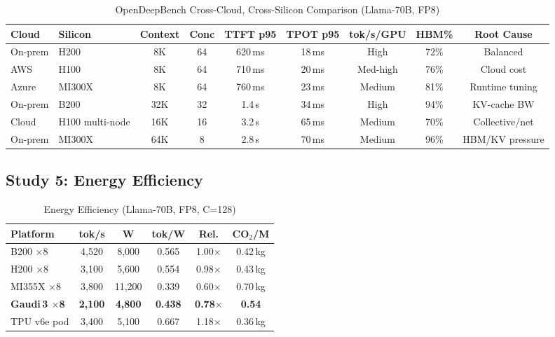 \documentclass[conference,10pt]{IEEEtran}
\begin{document}
\begin{table}[!htbp]
\caption{OpenDeepBench Cross-Cloud, Cross-Silicon Comparison (Llama-70B, FP8)}
\label{tab:odbresults}
\centering\footnotesize
\begin{tabular}{@{}llccccccc@{}}
\toprule
\textbf{Cloud} & \textbf{Silicon} & \textbf{Context} & \textbf{Conc} & \textbf{TTFT p95} & \textbf{TPOT p95} & \textbf{tok/s/GPU} & \textbf{HBM\%} & \textbf{Root Cause} \\
\midrule
On-prem & H200 & 8K & 64 & 620\,ms & 18\,ms & High & 72\% & Balanced \\
AWS & H100 & 8K & 64 & 710\,ms & 20\,ms & Med-high & 76\% & Cloud cost \\
Azure & MI300X & 8K & 64 & 760\,ms & 23\,ms & Medium & 81\% & Runtime tuning \\
On-prem & B200 & 32K & 32 & 1.4\,s & 34\,ms & High & 94\% & KV-cache BW \\
Cloud & H100 multi-node & 16K & 16 & 3.2\,s & 65\,ms & Medium & 70\% & Collective/net \\
On-prem & MI300X & 64K & 8 & 2.8\,s & 70\,ms & Medium & 96\% & HBM/KV pressure \\
\bottomrule
\end{tabular}
\end{table}

\subsection{Study 5: Energy Efficiency}

\begin{table}[!htbp]
\caption{Energy Efficiency (Llama-70B, FP8, C=128)}
\label{tab:en}
\centering\footnotesize
\begin{tabular}{@{}lccccc@{}}
\toprule
\textbf{Platform} & \textbf{tok/s} & \textbf{W} & \textbf{tok/W} & \textbf{Rel.} & \textbf{CO$_2$/M} \\
\midrule
B200 $\times$8 & 4,520 & 8,000 & 0.565 & 1.00$\times$ & 0.42\,kg \\
H200 $\times$8 & 3,100 & 5,600 & 0.554 & 0.98$\times$ & 0.43\,kg \\
MI355X $\times$8 & 3,800 & 11,200 & 0.339 & 0.60$\times$ & 0.70\,kg \\
\textbf{Gaudi\,3 $\times$8} & \textbf{2,100} & \textbf{4,800} & \textbf{0.438} & \textbf{0.78$\times$} & \textbf{0.54} \\
TPU v6e pod & 3,400 & 5,100 & 0.667 & 1.18$\times$ & 0.36\,kg \\
\bottomrule
\end{tabular}
\end{table}
\end{document}
